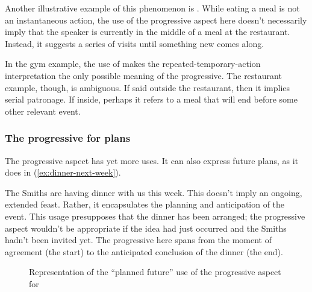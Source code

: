 Another illustrative example of this phenomenon is . While eating a meal is not an instantaneous action, the use of the progressive aspect here doesn't necessarily imply that the speaker is currently in the middle of a meal at the restaurant. Instead, it suggests a series of visits until something new comes along.

In the gym example, the use of  makes the repeated-temporary-action interpretation the only possible meaning of the progressive. The restaurant example, though, is ambiguous. If said outside the restaurant, then it implies serial patronage. If inside, perhaps it refers to a meal that will end before some other relevant event.

\subsubsection{The progressive for plans}
The progressive aspect has yet more uses. It can also express future plans, as it does in (\ref{ex:dinner-next-week}).

\ea The Smiths are having dinner with us this week.\label{ex:dinner-next-week}
\z
This doesn't imply an ongoing, extended feast. Rather, it encapsulates the planning and anticipation of the event. This usage presupposes that the dinner has been arranged; the progressive aspect wouldn't be appropriate if the idea had just occurred and the Smiths hadn't been invited yet. The progressive here spans from the moment of agreement (the start) to the anticipated conclusion of the dinner (the end).

\begin{figure}
    \caption{Representation of the ``planned future'' use of the progressive aspect for }
    \label{fig:futurate-progressive}
\end{figure}

